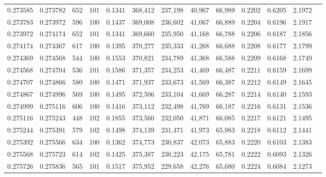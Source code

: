 \begin{tabular}{rrrrrrrrrrrrr}
0.273585 & 0.273782 &   652 & 101 &                                     0.1341 & 368,412 & 237,198 &  40,967 &  66,989 & 0.2202 & 0.6205 & 2.1972 \\
0.273783 & 0.273972 &   596 & 100 &                                     0.1437 & 369,008 & 236,602 &  41,067 &  66,889 & 0.2204 & 0.6196 & 2.1917 \\
0.273972 & 0.274174 &   652 & 101 &                                     0.1341 & 369,660 & 235,950 &  41,168 &  66,788 & 0.2206 & 0.6187 & 2.1856 \\
0.274174 & 0.274367 &   617 & 100 &                                     0.1395 & 370,277 & 235,333 &  41,268 &  66,688 & 0.2208 & 0.6177 & 2.1799 \\
0.274369 & 0.274568 &   544 & 100 &                                     0.1553 & 370,821 & 234,789 &  41,368 &  66,588 & 0.2209 & 0.6168 & 2.1749 \\
0.274568 & 0.274704 &   536 & 101 &                                     0.1586 & 371,357 & 234,253 &  41,469 &  66,487 & 0.2211 & 0.6159 & 2.1699 \\
0.274707 & 0.274866 &   580 & 100 &                                     0.1471 & 371,937 & 233,673 &  41,569 &  66,387 & 0.2212 & 0.6149 & 2.1645 \\
0.274867 & 0.274996 &   569 & 100 &                                     0.1495 & 372,506 & 233,104 &  41,669 &  66,287 & 0.2214 & 0.6140 & 2.1593 \\
0.274999 & 0.275116 &   606 & 100 &                                     0.1416 & 373,112 & 232,498 &  41,769 &  66,187 & 0.2216 & 0.6131 & 2.1536 \\
0.275116 & 0.275243 &   448 & 102 &                                     0.1855 & 373,560 & 232,050 &  41,871 &  66,085 & 0.2217 & 0.6121 & 2.1495 \\
0.275244 & 0.275391 &   579 & 102 &                                     0.1498 & 374,139 & 231,471 &  41,973 &  65,983 & 0.2218 & 0.6112 & 2.1441 \\
0.275392 & 0.275566 &   634 & 100 &                                     0.1362 & 374,773 & 230,837 &  42,073 &  65,883 & 0.2220 & 0.6103 & 2.1383 \\
0.275568 & 0.275723 &   614 & 102 &                                     0.1425 & 375,387 & 230,223 &  42,175 &  65,781 & 0.2222 & 0.6093 & 2.1326 \\
0.275726 & 0.275836 &   565 & 101 &                                     0.1517 & 375,952 & 229,658 &  42,276 &  65,680 & 0.2224 & 0.6084 & 2.1273 \\

\end{tabular}
